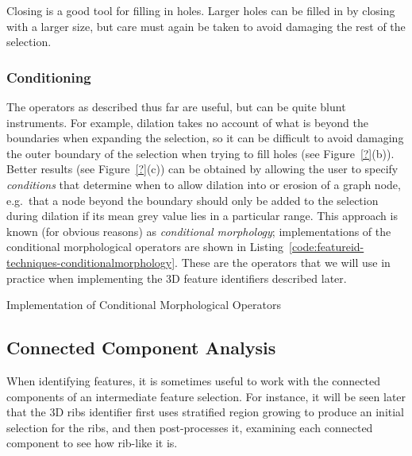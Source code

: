 Closing is a good tool for filling in holes. Larger holes can be filled in by closing with a larger size, but care must again be taken to avoid damaging the rest of the selection.

\subsubsection{Conditioning}

The operators as described thus far are useful, but can be quite blunt instruments. For example, dilation takes no account of what is beyond the boundaries when expanding the selection, so it can be difficult to avoid damaging the outer boundary of the selection when trying to fill holes (see Figure~\ref{?}(b)). Better results (see Figure~\ref{?}(c)) can be obtained by allowing the user to specify \emph{conditions} that determine when to allow dilation into or erosion of a graph node, e.g.~that a node beyond the boundary should only be added to the selection during dilation if its mean grey value lies in a particular range. This approach is known (for obvious reasons) as \emph{conditional morphology}; implementations of the conditional morphological operators are shown in Listing~\ref{code:featureid-techniques-conditionalmorphology}. These are the operators that we will use in practice when implementing the 3D feature identifiers described later.

\begin{stulisting}[p]
\caption{Implementation of Conditional Morphological Operators}
\label{code:featureid-techniques-conditionalmorphology}

\end{stulisting}

\subsection{Connected Component Analysis}

When identifying features, it is sometimes useful to work with the connected components of an intermediate feature selection. For instance, it will be seen later that the 3D ribs identifier first uses stratified region growing to produce an initial selection for the ribs, and then post-processes it, examining each connected component to see how rib-like it is.

